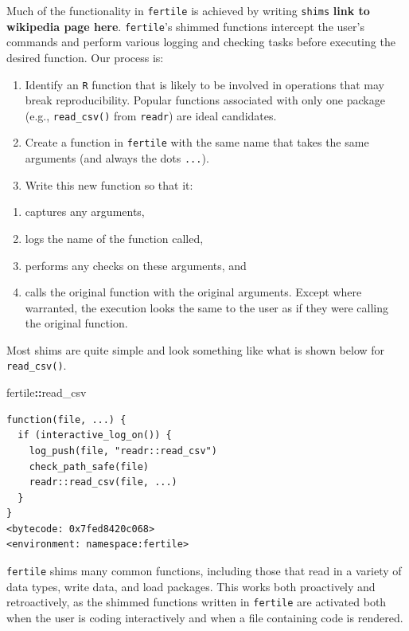 \documentclass[12pt,twoside]{reedthesis}
\newenvironment{Shaded}{\begin{snugshade}}{\end{snugshade}}
\newcommand{\OperatorTok}[1]{\textcolor[rgb]{0.81,0.36,0.00}{\textbf{#1}}}
\newcommand{\NormalTok}[1]{#1}
\providecommand{\tightlist}{%
  \setlength{\itemsep}{0pt}\setlength{\parskip}{0pt}}
\begin{document}
Much of the functionality in \texttt{fertile} is achieved by writing
\texttt{shims} \textbf{link to wikipedia page here}. \texttt{fertile}'s
shimmed functions intercept the user's commands and perform various
logging and checking tasks before executing the desired function. Our
process is:
\begin{enumerate}
\def\labelenumi{\arabic{enumi}.}
\item
  Identify an \texttt{R} function that is likely to be involved in
  operations that may break reproducibility. Popular functions
  associated with only one package (e.g., \texttt{read\_csv()} from
  \texttt{readr}) are ideal candidates.
\item
  Create a function in \texttt{fertile} with the same name that takes
  the same arguments (and always the dots \texttt{...}).
\item
  Write this new function so that it:
\end{enumerate}
\begin{enumerate}
\def\labelenumi{\alph{enumi})}
\tightlist
\item
  captures any arguments,
\item
  logs the name of the function called,
\item
  performs any checks on these arguments, and
\item
  calls the original function with the original arguments. Except where
  warranted, the execution looks the same to the user as if they were
  calling the original function.
\end{enumerate}
Most shims are quite simple and look something like what is shown below
for \texttt{read\_csv()}.
\begin{Shaded}
\begin{Highlighting}[]
\NormalTok{fertile}\OperatorTok{::}\NormalTok{read_csv}
\end{Highlighting}
\end{Shaded}
\begin{verbatim}
function(file, ...) {
  if (interactive_log_on()) {
    log_push(file, "readr::read_csv")
    check_path_safe(file)
    readr::read_csv(file, ...)
  }
}
<bytecode: 0x7fed8420c068>
<environment: namespace:fertile>
\end{verbatim}
\texttt{fertile} shims many common functions, including those that read
in a variety of data types, write data, and load packages. This works
both proactively and retroactively, as the shimmed functions written in
\texttt{fertile} are activated both when the user is coding
interactively and when a file containing code is rendered.
\end{document}
